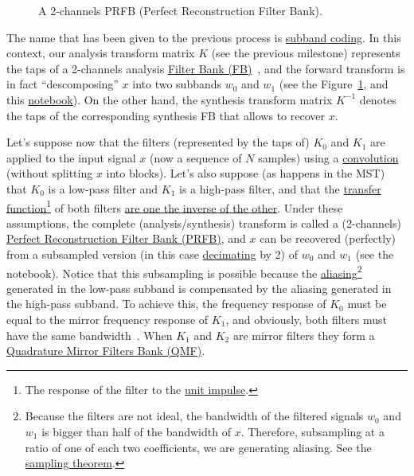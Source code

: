 \begin{figure}
  \centering
  \caption{A 2-channels PRFB (Perfect Reconstruction Filter Bank).}
  \label{fig:PRFB}
\end{figure}

The name that has been given to the previous process is
\href{https://en.wikipedia.org/wiki/Sub-band_coding}{subband
  coding}. In this context, our analysis transform matrix $K$ (see the
previous milestone) represents the taps of a 2-channels analysis
\href{https://en.wikipedia.org/wiki/Filter_bank}{Filter Bank
  (FB)}~\cite{vetterli1995wavelets}, and the forward transform is in
fact ``descomposing'' $x$ into two subbands $w_0$ and $w_1$ (see the
Figure~\ref{fig:PRFB}, and this \href{}{notebook}). On the other hand,
the synthesis transform matrix $K^{-1}$ denotes the taps of the
corresponding synthesis FB that allows to recover $x$.

Let's suppose now that the filters (represented by the taps of) $K_0$
and $K_1$ are applied to the input signal $x$ (now a sequence of $N$
samples) using a
\href{https://en.wikipedia.org/wiki/Kernel_(image_processing)}{convolution}
(without splitting $x$ into blocks). Let's also suppose (as happens in
the MST) that $K_0$ is a low-pass filter and $K_1$ is a high-pass
filter, and that the
\href{https://en.wikipedia.org/wiki/Filter_(signal_processing)#The_transfer_function}{transfer
  function}\footnote{The response of the filter to the
  \href{https://en.wikipedia.org/?title=Unit_impulse&redirect=no}{unit
    impulse}.} of both filters
\href{https://en.wikipedia.org/wiki/Filter_bank#Perfect_reconstruction_filter_banks}{are
  one the inverse of the other}. Under these assumptions, the complete
(analysis/synthesis) transform is called a (2-channels)
\href{https://en.wikipedia.org/wiki/Filter_bank#Perfect_reconstruction_filter_banks}{Perfect
  Reconstruction Filter Bank (PRFB)}, and $x$ can be recovered
(perfectly) from a subsampled version (in this case
\href{https://en.wikipedia.org/wiki/Downsampling_(signal_processing)}{decimating}
by 2) of $w_0$ and $w_1$ (see the notebook). Notice that this
subsampling is possible because the
\href{https://en.wikipedia.org/wiki/Aliasing}{aliasing}\footnote{Because
  the filters are not ideal, the bandwidth of the filtered signals
  $w_0$ and $w_1$ is bigger than half of the bandwidth of
  $x$. Therefore, subsampling at a ratio of one of each two
  coefficients, we are generating aliasing. See the
  \href{https://en.wikipedia.org/wiki/Nyquist-Shannon_sampling_theorem}{sampling
    theorem}.}  generated in the low-pass subband is compensated by
the aliasing generated in the high-pass subband. To achieve this, the
frequency response of $K_0$ must be equal to the mirror frequency
response of $K_1$, and obviously, both filters must have the same
bandwidth~\cite{sayood2017introduction}. When $K_1$ and $K_2$ are
mirror filters they form a
\href{https://en.wikipedia.org/wiki/Quadrature_mirror_filter}{Quadrature
  Mirror Filters Bank (QMF)}.

